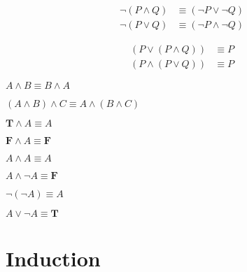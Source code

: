 \begin{axiom_appendix}
\begin{align*}
    \neg (P \wedge Q) &\equiv (\neg P \vee \neg Q) \\
    \neg (P \vee Q) &\equiv (\neg P \wedge \neg Q)
\end{align*}
\end{axiom_appendix}

\begin{axiom_appendix}
\begin{align*}
    (P \vee (P \wedge Q)) &\equiv P \\
    (P \wedge (P \vee Q)) &\equiv P
\end{align*}
\end{axiom_appendix}

\begin{axiom_appendix}
$A \wedge B \equiv B \wedge A$
\end{axiom_appendix}

\begin{axiom_appendix}
$(A \wedge B) \wedge C \equiv A \wedge (B \wedge C)$
\end{axiom_appendix}

\begin{axiom_appendix}
$\textbf{T} \wedge A \equiv A$
\end{axiom_appendix}

\begin{axiom_appendix}
$\textbf{F} \wedge A \equiv \textbf{F}$
\end{axiom_appendix}

\begin{axiom_appendix}
$A \wedge A \equiv A$
\end{axiom_appendix}

\begin{axiom_appendix}
$A \wedge \neg A \equiv \textbf{F}$
\end{axiom_appendix}

\begin{axiom_appendix}
$\neg (\neg A) \equiv A$
\end{axiom_appendix}

\begin{axiom_appendix}
$A \vee \neg A \equiv \textbf{T}$
\end{axiom_appendix}

\section*{Induction}

